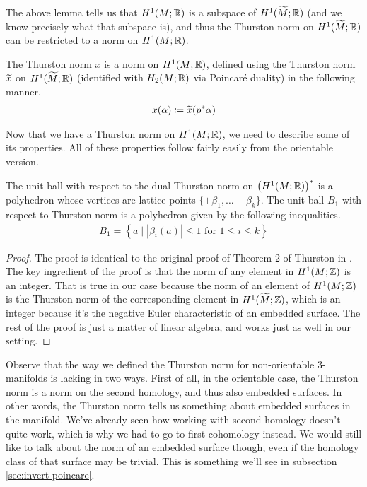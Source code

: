 The above lemma tells us that $H^1(M; \mathbb{R})$ is a subspace of $H^1(\widetilde{M}; \mathbb{R})$ (and we know
precisely what that subspace is), and thus the Thurston norm on $H^1(\widetilde{M}; \mathbb{R})$ can be
restricted to a norm on $H^1(M; \mathbb{R})$.

\begin{defn}
  The Thurston norm $x$ is a norm on $H^1(M; \mathbb{R})$, defined using the Thurston norm $\widetilde{x}$
  on $H^1(\widetilde{M}; \mathbb{R})$ (identified with $H_2(M; \mathbb{R})$ via Poincar\'e duality) in the following manner.
  \begin{align*}
    x(\alpha) \coloneqq \widetilde{x}(p^{\ast}\alpha)
  \end{align*}
\end{defn}
Now that we have a Thurston norm on $H^1(M; \mathbb{R})$, we need to describe some of its properties. All of these
properties follow fairly easily from the orientable version.
\begin{thm}
  The unit ball with respect to the dual Thurston norm on $\left( H^1(M; \mathbb{R}) \right)^{\ast}$ is a polyhedron
  whose vertices are lattice points $\{\pm \beta_1, \ldots \pm \beta_k\}$. The unit ball $B_1$ with respect to
  Thurston norm is a polyhedron given by the following inequalities.
  \begin{align*}
    B_1 = \left\{ a \mid \left| \beta_i(a) \right| \leq 1 \text{ for $1\leq i \leq k$} \right\}
  \end{align*}
\end{thm}

\begin{proof}
  The proof is identical to the original proof of Theorem $2$ of Thurston in
  \cite{thurston1986norm}. The key ingredient of the proof is that the norm of any element in
  $H^1(M; \mathbb{Z})$ is an integer. That is true in our case because the norm of an element of
  $H^1(M; \mathbb{Z})$ is the Thurston norm of the corresponding element in $H^1(\widetilde{M}; \mathbb{Z})$, which is an
  integer because it's the negative Euler characteristic of an embedded surface. The rest of the
  proof is just a matter of linear algebra, and works just as well in our setting.
\end{proof}

Observe that the way we defined the Thurston norm for non-orientable $3$-manifolds is lacking in two
ways. First of all, in the orientable case, the Thurston norm is a norm on the second homology, and thus also
embedded surfaces. In other words, the Thurston norm tells us something about embedded surfaces in the
manifold. We've already seen how working with second homology doesn't quite work, which is why we had to go to
first cohomology instead. We would still like to talk about the norm of an embedded surface though, even if
the homology class of that surface may be trivial.  This is something we'll see in subsection
\ref{sec:invert-poincare}.

